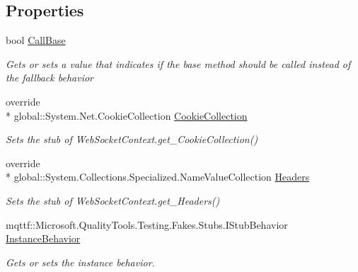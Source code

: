 \subsection*{Properties}
\begin{DoxyCompactItemize}
\item 
bool \hyperlink{class_system_1_1_net_1_1_web_sockets_1_1_fakes_1_1_stub_web_socket_context_a8cc4c6ac3a454bff1c8b619da59182d7}{Call\-Base}
\begin{DoxyCompactList}\small\item\em Gets or sets a value that indicates if the base method should be called instead of the fallback behavior\end{DoxyCompactList}\item 
override \\*
global\-::\-System.\-Net.\-Cookie\-Collection \hyperlink{class_system_1_1_net_1_1_web_sockets_1_1_fakes_1_1_stub_web_socket_context_a00a9dd5f148ba19661b4302a67c985d4}{Cookie\-Collection}
\begin{DoxyCompactList}\small\item\em Sets the stub of Web\-Socket\-Context.\-get\-\_\-\-Cookie\-Collection()\end{DoxyCompactList}\item 
override \\*
global\-::\-System.\-Collections.\-Specialized.\-Name\-Value\-Collection \hyperlink{class_system_1_1_net_1_1_web_sockets_1_1_fakes_1_1_stub_web_socket_context_a3beecd6512c064c4fdb4f9727d5e4666}{Headers}
\begin{DoxyCompactList}\small\item\em Sets the stub of Web\-Socket\-Context.\-get\-\_\-\-Headers()\end{DoxyCompactList}\item 
mqttf\-::\-Microsoft.\-Quality\-Tools.\-Testing.\-Fakes.\-Stubs.\-I\-Stub\-Behavior \hyperlink{class_system_1_1_net_1_1_web_sockets_1_1_fakes_1_1_stub_web_socket_context_a170f439fe92860b246b4a36aa1d2e377}{Instance\-Behavior}
\begin{DoxyCompactList}\small\item\em Gets or sets the instance behavior.\end{DoxyCompactList}\item 

\end{DoxyCompactItemize}
